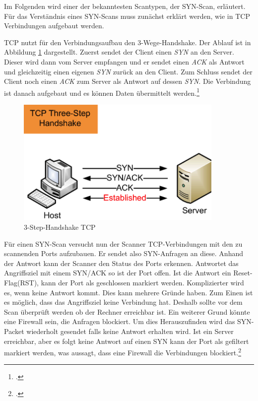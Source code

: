 Im Folgenden wird einer der bekanntesten Scantypen, der SYN-Scan, erläutert. Für das Verständnis eines SYN-Scans muss zunächst erklärt werden, wie in TCP Verbindungen aufgebaut werden.

TCP nutzt für den Verbindungsaufbau den 3-Wege-Handshake. Der Ablauf ist in Abbildung \ref{fig:handshake} dargestellt. Zuerst sendet der Client einen \textit{SYN} an den Server. Dieser wird dann vom Server empfangen und er sendet einen \textit{ACK} als Antwort und gleichzeitig einen eigenen \textit{SYN} zurück an den Client. Zum Schluss sendet der Client noch einen \textit{ACK} zum Server als Antwort auf dessen \textit{SYN}. Die Verbindung ist danach aufgebaut und es können Daten übermittelt werden.\footcite[Vgl.][32]{port2}
\begin{figure}[H]
  \centering
  \includegraphics[width=10cm]{images/handshake}
  \caption[3-Step-Handshake TCP]{3-Step-Handshake TCP\protect\footnotemark}
  \label{fig:handshake}
\end{figure}

Für einen SYN-Scan versucht nun der Scanner TCP-Verbindungen mit den zu scannenden Ports aufzubauen. Er sendet also SYN-Anfragen an diese. Anhand der Antwort kann der Scanner den Status des Ports erkennen. Antwortet das Angriffsziel mit einem SYN/ACK so ist der Port offen. Ist die Antwort ein Reset-Flag(RST), kann der Port als geschlossen markiert werden. Komplizierter wird es, wenn keine Antwort kommt. Dies kann mehrere Gründe haben. Zum Einen ist es möglich, dass das Angriffsziel keine Verbindung hat. Deshalb sollte vor dem Scan überprüft werden ob der Rechner erreichbar ist. Ein weiterer Grund könnte eine Firewall sein, die Anfragen blockiert. Um dies Herauszufinden wird das SYN-Packet wiederholt gesendet falls keine Antwort erhalten wird. Ist ein Server erreichbar, aber es folgt keine Antwort auf einen SYN kann der Port als gefiltert markiert werden, was aussagt, dass eine Firewall die Verbindungen blockiert.\footcite[Vgl.][33]{port2}

